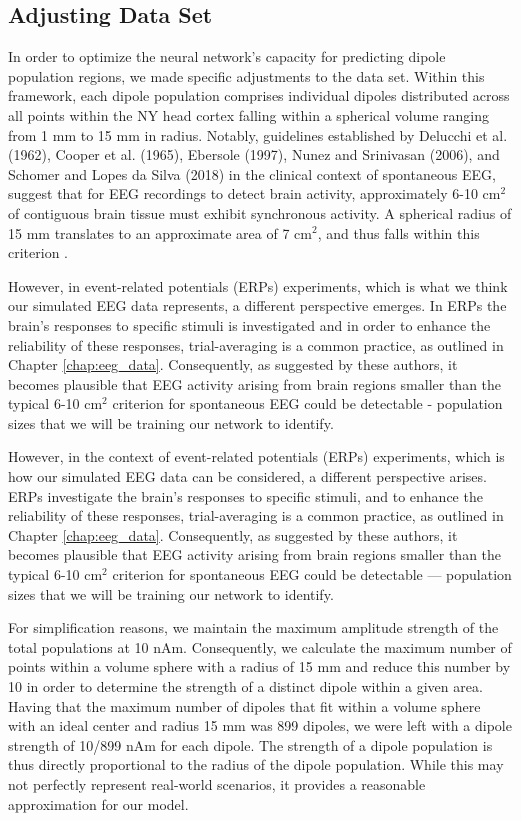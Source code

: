 \documentclass[a4paper, UKenglish, 11pt]{uiomaster}
\begin{document}
\subsection{Adjusting Data Set}
In order to optimize the neural network's capacity for predicting dipole population regions, we made specific adjustments to the data set. Within this framework, each dipole population comprises individual dipoles distributed across all points within the NY head cortex falling within a spherical volume ranging from 1 mm to 15 mm in radius. Notably, guidelines established by Delucchi et al. (1962)\cite{delucchi1962scalp}, Cooper et al. (1965)\cite{cooper1965comparison}, Ebersole (1997)\cite{ebersole1997defining}, Nunez and Srinivasan (2006)\cite{nunez2006electric}, and Schomer and Lopes da Silva (2018)\cite{niedermeyer2005electroencephalography} in the clinical context of spontaneous EEG, suggest that for EEG recordings to detect brain activity, approximately 6-10 cm$^2$ of contiguous brain tissue must exhibit synchronous activity. A spherical radius of 15 mm translates to an approximate area of 7 cm$^2$, and thus falls within this criterion \cite{nunez2019multi}.

However, in event-related potentials (ERPs) experiments, which is what we think our simulated EEG data represents, a different perspective emerges. In ERPs the brain's responses to specific stimuli is investigated and in order to enhance the reliability of these responses, trial-averaging is a common practice, as outlined in Chapter \ref{chap:eeg_data}. Consequently, as suggested by these authors, it becomes plausible that EEG activity arising from brain regions smaller than the typical 6-10 cm$^2$ criterion for spontaneous EEG could be detectable - population sizes that we will be training our network to identify.

However, in the context of event-related potentials (ERPs) experiments, which is how our simulated EEG data can be considered, a different perspective arises. ERPs investigate the brain's responses to specific stimuli, and to enhance the reliability of these responses, trial-averaging is a common practice, as outlined in Chapter \ref{chap:eeg_data}. Consequently, as suggested by these authors, it becomes plausible that EEG activity arising from brain regions smaller than the typical 6-10 cm$^2$ criterion for spontaneous EEG could be detectable — population sizes that we will be training our network to identify.

For simplification reasons, we maintain the maximum amplitude strength of the total populations at 10 nAm. Consequently, we calculate the maximum number of points within a volume sphere with a radius of 15 mm and reduce this number by 10 in order to determine the strength of a distinct dipole within a given area. Having that the maximum number of dipoles that fit within a volume sphere with an ideal center and radius 15 mm was 899 dipoles, we were left with a dipole strength of 10/899 nAm for each dipole. The strength of a dipole population is thus directly proportional to the radius of the dipole population. While this may not perfectly represent real-world scenarios, it provides a reasonable approximation for our model.
\end{document}
